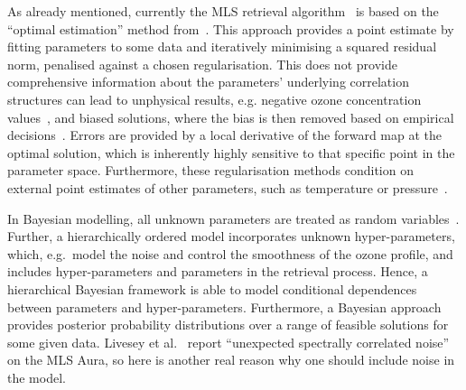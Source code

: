 As already mentioned, currently the MLS retrieval algorithm~\cite{livesey2006retrieval} is based on the ``optimal estimation'' method from~\cite{rodgers1976retrieval}.
This approach provides a point estimate by fitting parameters to some data and iteratively minimising a squared residual norm, penalised against a chosen regularisation.
This does not provide comprehensive information about the parameters' underlying correlation structures can lead to unphysical results, e.g. negative ozone concentration values~\cite{MLSdata}, and biased solutions, where the bias is then removed based on empirical decisions~\cite{livesey2008ozonecarbonmono, Froidevaux2008snrozone}.
Errors are provided by a local derivative of the forward map at the optimal solution, which is inherently highly sensitive to that specific point in the parameter space.
Furthermore, these regularisation methods condition on external point estimates of other parameters, such as temperature or pressure~\cite{livesey2006retrieval}.

In Bayesian modelling, all unknown parameters are treated as random variables~\cite{kaipio2005statinv}.
Further, a hierarchically ordered model incorporates unknown hyper-parameters, which, e.g.~model the noise and control the smoothness of the ozone profile, and includes hyper-parameters and parameters in the retrieval process.
Hence, a hierarchical Bayesian framework is able to model conditional dependences between parameters and hyper-parameters.
Furthermore, a Bayesian approach provides posterior probability distributions over a range of feasible solutions for some given data.
Livesey et al.~\cite{livesey2006retrieval} report ``unexpected spectrally correlated noise'' on the MLS Aura, so here is another real reason why one should include noise in the model.

